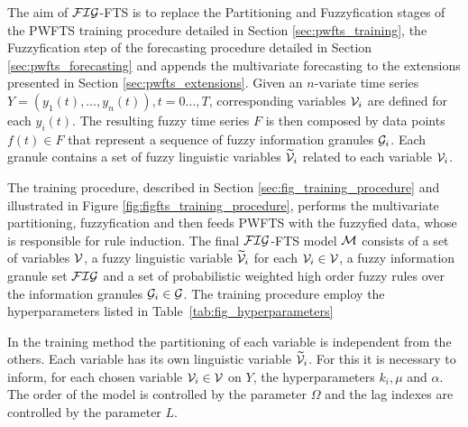 The aim of $\mathcal{FIG}$-FTS is to replace the Partitioning and Fuzzyfication stages of the PWFTS training procedure detailed in Section \ref{sec:pwfts_training}, the Fuzzyfication step of the forecasting procedure detailed in Section \ref{sec:pwfts_forecasting} and appends the multivariate forecasting to the extensions presented in Section \ref{sec:pwfts_extensions}.
\index{$\figi$}
Given an $n$-variate time series $Y=(y_1(t), \ldots,y_n(t)),  t=0\ldots,T$, corresponding variables $\mathcal{V}_i$ are defined for each $y_i(t)$. The resulting fuzzy time series $F$ is then composed by data points $f(t) \in F$ that represent a sequence of fuzzy information granules $\figi$. Each granule contains a set of fuzzy linguistic variables $\widetilde{\mathcal{V}}_i$ related to each variable $\mathcal{V}_i$.

The training procedure, described in Section \ref{sec:fig_training_procedure} and illustrated in Figure \ref{fig:figfts_training_procedure}, performs the multivariate partitioning, fuzzyfication and then feeds PWFTS with the fuzzyfied data, whose is responsible for rule induction. The final $\mathcal{FIG}$-FTS model $\mathcal{M}$ consists of a set of variables $\mathcal{V}$, a fuzzy linguistic variable $\widetilde{\mathcal{V}}_i$ for each $\mathcal{V}_i \in \mathcal{V}$, a fuzzy information granule set $\mathcal{FIG}$ and a set of probabilistic weighted high order fuzzy rules over the information granules $\mathcal{G}_i \in \mathcal{G}$. The training procedure employ the hyperparameters listed in Table~\ref{tab:fig_hyperparameters}

In the training method the partitioning of each variable is independent from the others. Each variable has its own linguistic variable $\widetilde{\mathcal{V}}_i$. For this it is necessary to inform, for each chosen variable $\mathcal{V}_i \in \mathcal{V}$ on $Y$, the hyperparameters $k_i, \mu$ and $\alpha$. The order of the model is controlled by the parameter $\Omega$ and the lag indexes are controlled by the parameter $L$. 

